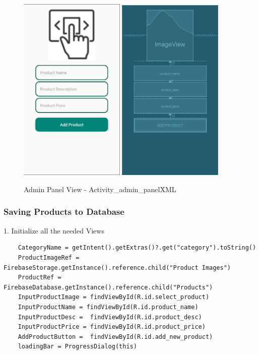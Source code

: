 \begin{figure}[h!]
	\caption{Admin Panel View - Activity\_admin\_panel\.XML}
	\label{image:myImageName}
	\centering
	\includegraphics[width=0.45\textwidth]{Images/admin_view.png}
	\includegraphics[width=0.45\textwidth]{Images/admin_design.png}
\end{figure}


\subsubsection{Saving Products to Database}

1. Initialize all the needed Views
\begin{verbatim}
    CategoryName = getIntent().getExtras()?.get("category").toString()
    ProductImageRef = FirebaseStorage.getInstance().reference.child("Product Images")
    ProductRef = FirebaseDatabase.getInstance().reference.child("Products")
    InputProductImage = findViewById(R.id.select_product)
    InputProductName = findViewById(R.id.product_name)
    InputProductDesc =  findViewById(R.id.product_desc)
    InputProductPrice = findViewById(R.id.product_price)
    AddProductButton =  findViewById(R.id.add_new_product)
    loadingBar = ProgressDialog(this)
\end{verbatim}

